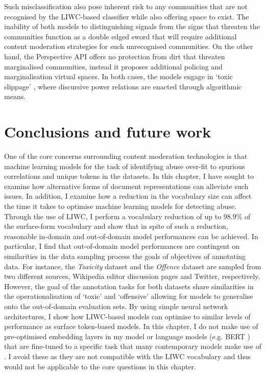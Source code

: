Such misclassification also pose inherent risk to any communities that are not recognised by the LIWC-based classifier while also offering space  to exist.
The inability of both models to distinguishing signals from the signs that threaten the communities function as a double edged sword that will require additional content moderation strategies for such unrecognised communities.
On the other hand, the Perspective API offers no protection from dirt that threaten marginalised communities, instead it proposes additional policing and marginalisation virtual spaces.
In both cases, the models engage in `toxic slippage' \citep{Risam:2015}, where discursive power relations are enacted through algorithmic means.

\section{Conclusions and future work}
One of the core concerns surrounding content moderation technologies is that machine learning models for the task of identifying abuse over-fit to spurious correlations and unique tokens in the datasets.
In this chapter, I have sought to examine how alternative forms of document representations can alleviate such issues.
In addition, I examine how a reduction in the vocabulary size can affect the time it takes to optimise machine learning models for detecting abuse.
Through the use of LIWC, I perform a vocabulary reduction of up to $98.9\%$ of the surface-form vocabulary and show that in spite of such a reduction, reasonable in-domain and out-of-domain model performances can be achieved.
In particular, I find that out-of-domain model performances are contingent on similarities in the data sampling process  the goals of objectives of annotating data.
For instance, the \textit{Toxicity} dataset and the \textit{Offence} dataset are sampled from two different sources, Wikipedia editor discussion pages and Twitter, respectively.
However, the goal of the annotation tasks for both datasets share similarities in the operationalisation of `toxic' and `offensive' allowing for models to generalise onto the out-of-domain evaluation sets.
By using simple neural network architectures, I show how LIWC-based models can optimise to similar levels of performance as surface token-based models.
In this chapter, I do not make use of pre-optimised embedding layers \citep{Park:2017,Kolhatkar:2020} in my model or language models (e.g. BERT \citep{Devlin:2019}) that are fine-tuned to a specific task that many contemporary models make use of \citet[e.g.]{Vidgen_learning:2020,Isaksen:2020}.
I avoid these as they are not compatible with the LIWC vocabulary and thus would not be applicable to the core questions in this chapter.

